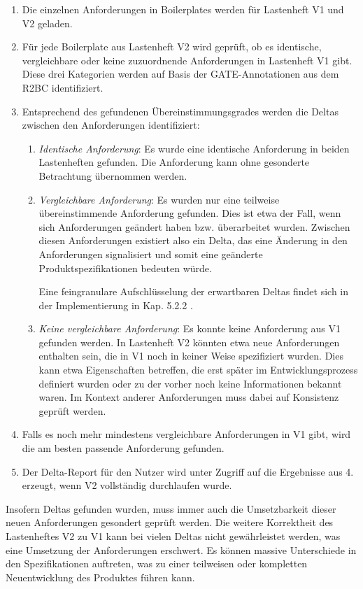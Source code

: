 \documentclass[12pt]{report}
\begin{document}
\begin{enumerate}
\item Die einzelnen Anforderungen in Boilerplates werden für Lastenheft V1 und V2 geladen.
\item Für jede Boilerplate aus Lastenheft V2 wird geprüft, ob es identische, vergleichbare oder keine zuzuordnende Anforderungen in Lastenheft V1 gibt. Diese drei Kategorien werden auf Basis der GATE-Annotationen aus dem R2BC identifiziert.
\item Entsprechend des gefundenen Übereinstimmungsgrades werden die Deltas zwischen den Anforderungen identifiziert:
\begin{enumerate}
\item \textit{Identische Anforderung}: Es wurde eine identische Anforderung in beiden Lastenheften gefunden. Die Anforderung kann ohne gesonderte Betrachtung übernommen werden.

\item \textit{Vergleichbare Anforderung}: Es wurden nur eine teilweise übereinstimmende Anforderung gefunden. Dies ist etwa der Fall, wenn sich Anforderungen geändert haben bzw. überarbeitet wurden. Zwischen diesen Anforderungen existiert also ein Delta, das eine Änderung in den Anforderungen signalisiert und somit eine geänderte Produktspezifikationen bedeuten würde. 

Eine feingranulare Aufschlüsselung der erwartbaren Deltas findet sich in der Implementierung in Kap. 5.2.2 .

\item \textit{Keine vergleichbare Anforderung}: Es konnte keine Anforderung aus V1 gefunden werden. In Lastenheft V2 könnten etwa neue Anforderungen enthalten sein, die in V1 noch in keiner Weise spezifiziert wurden. Dies kann etwa Eigenschaften betreffen, die erst später im Entwicklungsprozess definiert wurden oder zu der vorher noch keine Informationen bekannt waren. Im Kontext anderer Anforderungen muss dabei auf Konsistenz geprüft werden.
\end{enumerate} 
\item Falls es noch mehr mindestens vergleichbare Anforderungen in V1 gibt, wird die am besten passende Anforderung gefunden. 
\item Der Delta-Report für den Nutzer wird unter Zugriff auf die Ergebnisse aus 4. erzeugt, wenn V2 vollständig durchlaufen wurde.
\end{enumerate}
Insofern Deltas gefunden wurden, muss immer auch die Umsetzbarkeit dieser neuen Anforderungen gesondert geprüft werden. Die weitere Korrektheit des Lastenheftes V2 zu V1 kann bei vielen Deltas nicht gewährleistet werden, was eine Umsetzung der Anforderungen erschwert. Es können massive Unterschiede in den Spezifikationen auftreten, was zu einer teilweisen oder kompletten Neuentwicklung des Produktes führen kann.
\end{document}
